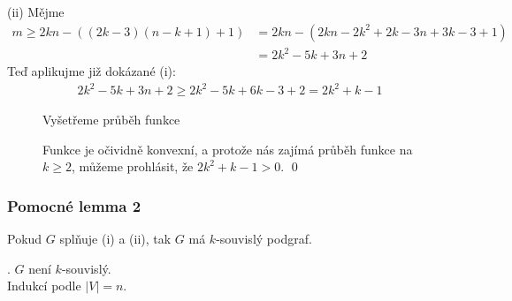 (ii) Mějme
\begin{align*}
    m \geq 2kn - ((2k-3)(n-k+1)+1) &= 2kn - (2kn - 2k^2 + 2k - 3n+ 3k-3+1)\\
    &= 2k^2 - 5k + 3n + 2
\end{align*}
Teď aplikujme již dokázané (i):
\begin{align*}
    2k^2 - 5k + 3n + 2 \geq 2k^2 - 5k + 6k - 3 + 2 = 2k^2 + k - 1 
\end{align*}
\begin{figure}[H]
    \begin{minipage}[c]{0.4\textwidth}
        Vyšetřeme průběh funkce
        \begin{figure}[H]
        \end{figure}
    \end{minipage}%
    \hspace{0.05\textwidth}
    \begin{minipage}[c]{0.5\textwidth}
        Funkce je očividně konvexní, a protože nás zajímá průběh funkce na $k \geq 2$, můžeme prohlásit, že 
        $2k^2 + k - 1 > 0$. \hspace{\fill} \qed
    \end{minipage}
\end{figure}

\subsubsection{Pomocné lemma 2}
Pokud $G$ splňuje (i) a (ii), tak $G$ má $k$-souvislý podgraf.

. $G$ není $k$-souvislý.\\
Indukcí podle $|V| = n$.

